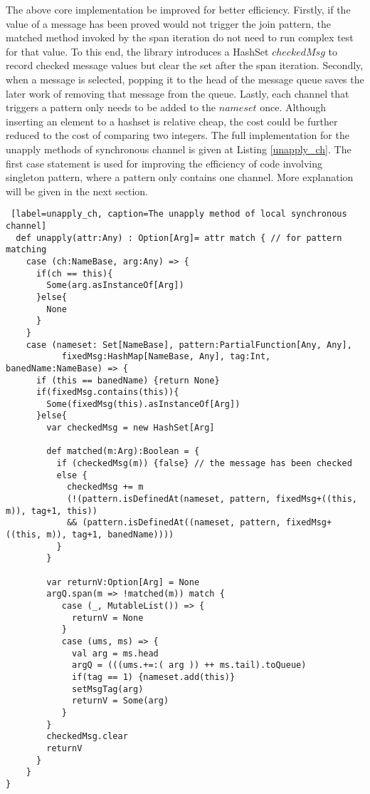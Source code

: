 The above core implementation be improved for better efficiency.  Firstly, if the value of a message has been proved would not trigger the join pattern, the matched method invoked by the span iteration do not need to run complex test for that value.  To this end, the library introduces a HashSet $checkedMsg$ to record checked message values but clear the set after the span iteration.  Secondly, when a message is selected, popping it to the head of the message queue saves the later work of removing that message from the queue.  Lastly, each channel that triggers a pattern only needs to be added to the $nameset$ once.  Although inserting an element to a hashset is relative cheap, the cost could be further reduced to the cost of comparing two integers.  The full implementation for the unapply methods of synchronous channel is given at Listing \ref{unapply_ch}.  The first case statement is used for improving the efficiency of code involving singleton pattern, where a pattern only contains one channel.  More explanation will be given in the next section.
 
\begin{lstlisting} [label=unapply_ch, caption=The unapply method of local synchronous channel]
  def unapply(attr:Any) : Option[Arg]= attr match { // for pattern matching
    case (ch:NameBase, arg:Any) => {
      if(ch == this){
        Some(arg.asInstanceOf[Arg])
      }else{
        None
      }
    }
    case (nameset: Set[NameBase], pattern:PartialFunction[Any, Any], 
           fixedMsg:HashMap[NameBase, Any], tag:Int, banedName:NameBase) => {
      if (this == banedName) {return None}      
      if(fixedMsg.contains(this)){
        Some(fixedMsg(this).asInstanceOf[Arg])
      }else{        
        var checkedMsg = new HashSet[Arg]
        
        def matched(m:Arg):Boolean = {
          if (checkedMsg(m)) {false} // the message has been checked
          else {
            checkedMsg += m
            (!(pattern.isDefinedAt(nameset, pattern, fixedMsg+((this, m)), tag+1, this))
            && (pattern.isDefinedAt((nameset, pattern, fixedMsg+((this, m)), tag+1, banedName))))
          }
        }
        
        var returnV:Option[Arg] = None
        argQ.span(m => !matched(m)) match {
           case (_, MutableList()) => {
             returnV = None
           }
           case (ums, ms) => {
             val arg = ms.head
             argQ = (((ums.+=:( arg )) ++ ms.tail).toQueue)
             if(tag == 1) {nameset.add(this)}
             setMsgTag(arg)
             returnV = Some(arg)
           }
        }
        checkedMsg.clear
        returnV
      }
    }
}
\end{lstlisting}

